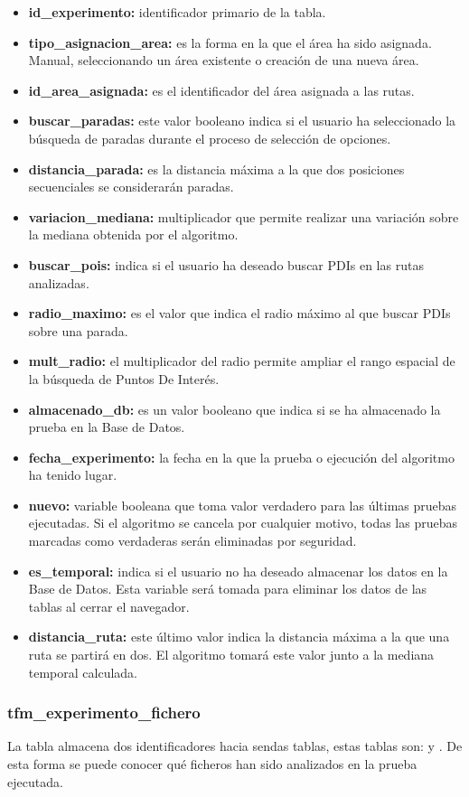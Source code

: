 \begin{itemize}
	\item \textbf{id\_experimento:} identificador primario de la tabla.
	\item \textbf{tipo\_asignacion\_area:} es la forma en la que el área ha sido asignada. Manual, seleccionando un área existente o creación de una nueva área.
	\item \textbf{id\_area\_asignada:} es el identificador del área asignada a las rutas.
	\item \textbf{buscar\_paradas:} este valor booleano indica si el usuario ha seleccionado la búsqueda de paradas durante el proceso de selección de opciones.
	\item \textbf{distancia\_parada:} es la distancia máxima a la que dos posiciones secuenciales se considerarán paradas.
	\item \textbf{variacion\_mediana:} multiplicador que permite realizar una variación sobre la mediana obtenida por el algoritmo.
	\item \textbf{buscar\_pois:} indica si el usuario ha deseado buscar PDIs en las rutas analizadas.
	\item \textbf{radio\_maximo:} es el valor que indica el radio máximo al que buscar PDIs sobre una parada.
	\item \textbf{mult\_radio:} el multiplicador del radio permite ampliar el rango espacial de la búsqueda de Puntos De Interés.
	\item \textbf{almacenado\_db:} es un valor booleano que indica si se ha almacenado la prueba en la Base de Datos.
	\item \textbf{fecha\_experimento:} la fecha en la que la prueba o ejecución del algoritmo ha tenido lugar.
	\item \textbf{nuevo:} variable booleana que toma valor verdadero para las últimas pruebas ejecutadas. Si el algoritmo se cancela por cualquier motivo, todas las pruebas marcadas como verdaderas serán eliminadas por seguridad.
	\item \textbf{es\_temporal:} indica si el usuario no ha deseado almacenar los datos en la Base de Datos. Esta variable será tomada para eliminar los datos de las tablas al cerrar el navegador.
	\item \textbf{distancia\_ruta:} este último valor indica la distancia máxima a la que una ruta se partirá en dos. El algoritmo tomará este valor junto a la mediana temporal calculada.
\end{itemize}

\subsubsection{tfm\_experimento\_fichero}
La tabla  almacena dos identificadores hacia sendas tablas, estas tablas son:  y . De esta forma se puede  conocer qué ficheros han sido analizados en la prueba ejecutada.

